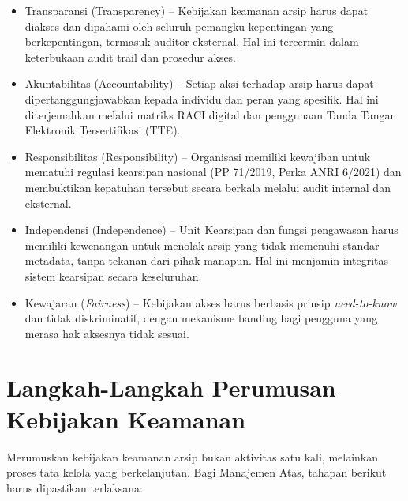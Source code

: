 \documentclass[12pt,a4paper]{report}
\begin{document}
\begin{itemize}[leftmargin=*]
    \item Transparansi (Transparency) -- Kebijakan keamanan arsip harus dapat diakses dan dipahami oleh seluruh pemangku kepentingan yang berkepentingan, termasuk auditor eksternal. Hal ini tercermin dalam keterbukaan audit trail dan prosedur akses.
    \item Akuntabilitas (Accountability) -- Setiap aksi terhadap arsip harus dapat dipertanggungjawabkan kepada individu dan peran yang spesifik. Hal ini diterjemahkan melalui matriks RACI digital dan penggunaan Tanda Tangan Elektronik Tersertifikasi (TTE).
    \item Responsibilitas (Responsibility) -- Organisasi memiliki kewajiban untuk mematuhi regulasi kearsipan nasional (PP 71/2019, Perka ANRI 6/2021) dan membuktikan kepatuhan tersebut secara berkala melalui audit internal dan eksternal.
    \item Independensi (Independence) -- Unit Kearsipan dan fungsi pengawasan harus memiliki kewenangan untuk menolak arsip yang tidak memenuhi standar metadata, tanpa tekanan dari pihak manapun. Hal ini menjamin integritas sistem kearsipan secara keseluruhan.
    \item Kewajaran (\textit{Fairness}) -- Kebijakan akses harus berbasis prinsip \textit{need-to-know} dan tidak diskriminatif, dengan mekanisme banding bagi pengguna yang merasa hak aksesnya tidak sesuai.
\end{itemize}


\section{Langkah-Langkah Perumusan Kebijakan Keamanan}
Merumuskan kebijakan keamanan arsip bukan aktivitas satu kali, melainkan proses tata kelola yang berkelanjutan. Bagi Manajemen Atas, tahapan berikut harus dipastikan terlaksana:
\end{document}
